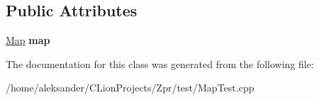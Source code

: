 \subsection*{Public Attributes}
\begin{DoxyCompactItemize}
\item 
\hypertarget{classMapTest_afce2195037e3d9053a96b17ccc0cd6f8}{\hyperlink{classMap}{Map} {\bfseries map}}\label{classMapTest_afce2195037e3d9053a96b17ccc0cd6f8}

\end{DoxyCompactItemize}


The documentation for this class was generated from the following file\-:\begin{DoxyCompactItemize}
\item 
/home/aleksander/\-C\-Lion\-Projects/\-Zpr/test/Map\-Test.\-cpp\end{DoxyCompactItemize}
